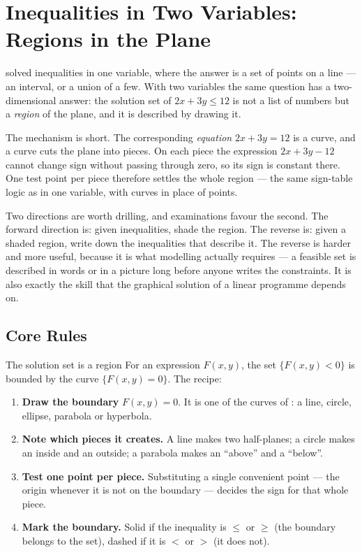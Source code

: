 \chapter{Inequalities in Two Variables: Regions in the Plane}

 solved inequalities in one variable, where the answer is
a set of points on a line --- an interval, or a union of a few. With two variables
the same question has a two-dimensional answer: the solution set of
$2x+3y\le12$ is not a list of numbers but a \emph{region} of the plane, and
it is described by drawing it.

The mechanism is short. The corresponding \emph{equation} $2x+3y=12$ is a
curve, and a curve cuts the plane into pieces. On each piece the expression
$2x+3y-12$ cannot change sign without passing through zero, so its sign is
constant there. One test point per piece therefore settles the whole
region --- the same sign-table logic as in one variable, with curves in
place of points.

Two directions are worth drilling, and examinations favour the second. The
forward direction is: given inequalities, shade the region. The reverse is:
given a shaded region, write down the inequalities that describe it. The
reverse is harder and more useful, because it is what modelling actually
requires --- a feasible set is described in words or in a picture long before
anyone writes the constraints. It is also exactly the skill that the
graphical solution of a linear programme depends on.

\section{Core Rules}

\begin{rulebox}{The solution set is a region}
For an expression $F(x,y)$, the set $\{F(x,y)<0\}$ is bounded by the curve
$\{F(x,y)=0\}$. The recipe:
\begin{enumerate}[leftmargin=1.8em,itemsep=0.3ex]
  \item \textbf{Draw the boundary} $F(x,y)=0$. It is one of the curves of
        : a line, circle, ellipse, parabola or hyperbola.
  \item \textbf{Note which pieces it creates.} A line makes two half-planes;
        a circle makes an inside and an outside; a parabola makes an
        ``above'' and a ``below''.
  \item \textbf{Test one point per piece.} Substituting a single convenient
        point --- the origin whenever it is not on the boundary --- decides
        the sign for that whole piece.
  \item \textbf{Mark the boundary.} Solid if the inequality is
        $\le$ or $\ge$ (the boundary belongs to the set), dashed if it is
        $<$ or $>$ (it does not).
\end{enumerate}
\end{rulebox}

